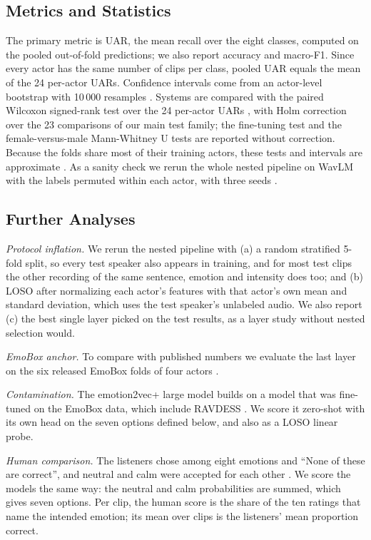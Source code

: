 \documentclass[journal]{IEEEtran}
\begin{document}
\subsection{Metrics and Statistics}
The primary metric is UAR, the mean recall over the eight classes, computed on the pooled out-of-fold predictions; we also report accuracy and macro-F1. Since every actor has the same number of clips per class, pooled UAR equals the mean of the 24 per-actor UARs. Confidence intervals come from an actor-level bootstrap with 10\,000 resamples \cite{efron1993bootstrap}. Systems are compared with the paired Wilcoxon signed-rank test over the 24 per-actor UARs \cite{wilcoxon1945,demsar2006statistical}, with Holm correction \cite{holm1979} over the 23 comparisons of our main test family; the fine-tuning test and the female-versus-male Mann-Whitney U tests are reported without correction. Because the folds share most of their training actors, these tests and intervals are approximate \cite{nadeau2003inference}. As a sanity check we rerun the whole nested pipeline on WavLM with the labels permuted within each actor, with three seeds \cite{ojala2010permutation}.

\subsection{Further Analyses}
\emph{Protocol inflation.} We rerun the nested pipeline with (a) a random stratified 5-fold split, so every test speaker also appears in training, and for most test clips the other recording of the same sentence, emotion and intensity does too; and (b) LOSO after normalizing each actor's features with that actor's own mean and standard deviation, which uses the test speaker's unlabeled audio. We also report (c) the best single layer picked on the test results, as a layer study without nested selection would.

\emph{EmoBox anchor.} To compare with published numbers we evaluate the last layer on the six released EmoBox folds of four actors \cite{ma2024emobox}.

\emph{Contamination.} The emotion2vec+ large model builds on a model that was fine-tuned on the EmoBox data, which include RAVDESS \cite{emotion2vecplus}. We score it zero-shot with its own head on the seven options defined below, and also as a LOSO linear probe.

\emph{Human comparison.} The listeners chose among eight emotions and ``None of these are correct'', and neutral and calm were accepted for each other \cite{livingstone2018ravdess}. We score the models the same way: the neutral and calm probabilities are summed, which gives seven options. Per clip, the human score is the share of the ten ratings that name the intended emotion; its mean over clips is the listeners' mean proportion correct.
\end{document}
